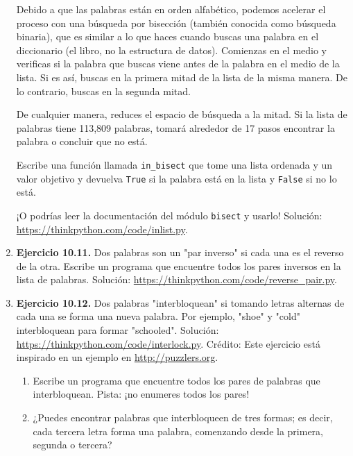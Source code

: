 \begin{enumerate}
    Debido a que las palabras están en orden alfabético, podemos acelerar el proceso con una búsqueda por bisección (también conocida como búsqueda binaria), que es similar a lo que haces cuando buscas una palabra en el diccionario (el libro, no la estructura de datos). Comienzas en el medio y verificas si la palabra que buscas viene antes de la palabra en el medio de la lista. Si es así, buscas en la primera mitad de la lista de la misma manera. De lo contrario, buscas en la segunda mitad.
    
    De cualquier manera, reduces el espacio de búsqueda a la mitad. Si la lista de palabras tiene 113,809 palabras, tomará alrededor de 17 pasos encontrar la palabra o concluir que no está.
    
    Escribe una función llamada \texttt{in\_bisect} que tome una lista ordenada y un valor objetivo y devuelva \texttt{True} si la palabra está en la lista y \texttt{False} si no lo está.
    
    ¡O podrías leer la documentación del módulo \texttt{bisect} y usarlo! Solución: \url{https://thinkpython.com/code/inlist.py}.
    
    \item \textbf{Ejercicio 10.11.} Dos palabras son un "par inverso" si cada una es el reverso de la otra. Escribe un programa que encuentre todos los pares inversos en la lista de palabras. Solución: \url{https://thinkpython.com/code/reverse_pair.py}.
    
    \item \textbf{Ejercicio 10.12.} Dos palabras "interbloquean" si tomando letras alternas de cada una se forma una nueva palabra. Por ejemplo, "shoe" y "cold" interbloquean para formar "schooled". Solución: \url{https://thinkpython.com/code/interlock.py}. Crédito: Este ejercicio está inspirado en un ejemplo en \url{http://puzzlers.org}.
    
    \begin{enumerate}
        \item Escribe un programa que encuentre todos los pares de palabras que interbloquean. Pista: ¡no enumeres todos los pares!
        \item ¿Puedes encontrar palabras que interbloqueen de tres formas; es decir, cada tercera letra forma una palabra, comenzando desde la primera, segunda o tercera?
    \end{enumerate}
\end{enumerate}